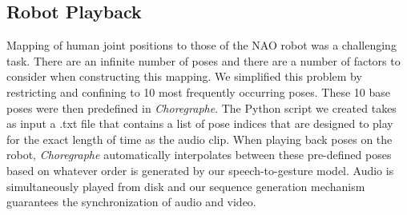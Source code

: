 \subsection{Robot Playback}
Mapping of human joint positions to those of the NAO robot was a challenging task. There are an infinite number of poses and there are a number of factors to consider when constructing this mapping. We simplified this problem by restricting and confining to 10 most frequently occurring poses. These 10 base poses were then predefined in \textit{Choregraphe}. The Python script we created takes as input a .txt file that contains a list of pose indices that are designed to play for the exact length of time as the audio clip. When playing back poses on the robot, \textit{Choregraphe} automatically interpolates between these pre-defined poses based on whatever order is generated by our speech-to-gesture model. Audio is simultaneously played from disk and our sequence generation mechanism guarantees the synchronization of audio and video.

